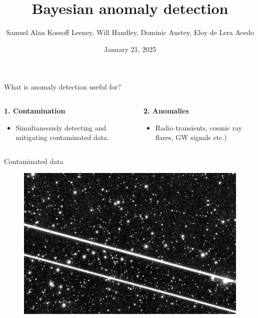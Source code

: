\documentclass[aspectratio=169]{beamer}
\title{Bayesian anomaly detection}
\date{January 21, 2025}
\author{Samuel Alan Kossoff Leeney, Will Handley, Dominic Anstey, Eloy de Lera Acedo}
\institute{Will Handley group meeting}
\begin{document}
\begin{frame}
  \titlepage
\end{frame}

\begin{frame}{What is anomaly detection useful for?}
  \begin{columns}
    \begin{column}{0.5\textwidth}
        \textbf{1. Contamination}
        \begin{itemize}
          \item Simultaneously detecting and mitigating contaminated data.
        \end{itemize}
    \end{column}
    \begin{column}{0.5\textwidth}
        \textbf{2. Anomalies}
        \begin{itemize}
          \item Radio transients, cosmic ray flares, GW signals etc.)
        \end{itemize}
    \end{column}
  \end{columns}
\end{frame}

\begin{frame}{Contaminated data}
  \begin{figure}
    \centering
    \includegraphics[width=\textwidth]{images/starlink2.png}
  \end{figure}
\end{frame}
\end{document}
